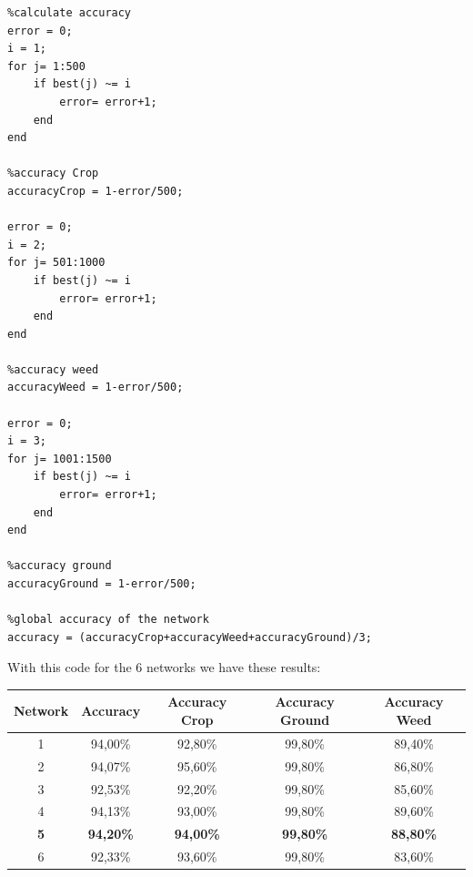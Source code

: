 \documentclass[]{report}
\begin{document}
\begin{lstlisting}
%calculate accuracy
error = 0;
i = 1;
for j= 1:500
    if best(j) ~= i
        error= error+1;
    end
end

%accuracy Crop
accuracyCrop = 1-error/500;

error = 0;
i = 2;
for j= 501:1000
    if best(j) ~= i
        error= error+1;
    end
end

%accuracy weed
accuracyWeed = 1-error/500;

error = 0;
i = 3;
for j= 1001:1500
    if best(j) ~= i
        error= error+1;
    end
end

%accuracy ground
accuracyGround = 1-error/500;

%global accuracy of the network
accuracy = (accuracyCrop+accuracyWeed+accuracyGround)/3;

\end{lstlisting}

With this code for the 6 networks we have these results:

\begin{table}[h]
\centering

\begin{tabular}{|c|c|c|c|c|}
 \hline
 \textbf{Network} & \textbf{Accuracy} & \textbf{Accuracy Crop} & \textbf{Accuracy Ground} & \textbf{Accuracy Weed} \\ \hline
 1 & 94,00\% & 92,80\%  & 99,80\%  & 89,40\%  \\ \hline
 2 & 94,07\% & 95,60\%  & 99,80\%  & 86,80\%  \\ \hline
 3 & 92,53\% & 92,20\%  & 99,80\%  & 85,60\%  \\ \hline
 4 & 94,13\% & 93,00\%  & 99,80\%  & 89,60\%  \\ \hline
 \textbf{5} & \textbf{94,20\%} & \textbf{94,00\%}  & \textbf{99,80\%}  & \textbf{88,80\%}  \\ \hline
 6 & 92,33\% & 93,60\%  & 99,80\%  & 83,60\%  \\ \hline
\end{tabular}
\end{table}
\end{document}
